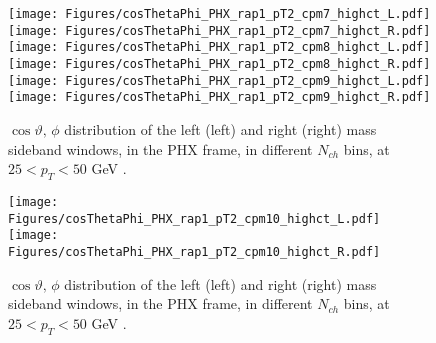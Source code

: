 \documentclass[12pt]{article}
\begin{document}
\begin{figure}[htbp]
\centering
\texttt{[image: Figures/cosThetaPhi\_PHX\_rap1\_pT2\_cpm7\_highct\_L.pdf]}
\texttt{[image: Figures/cosThetaPhi\_PHX\_rap1\_pT2\_cpm7\_highct\_R.pdf]}
\texttt{[image: Figures/cosThetaPhi\_PHX\_rap1\_pT2\_cpm8\_highct\_L.pdf]}
\texttt{[image: Figures/cosThetaPhi\_PHX\_rap1\_pT2\_cpm8\_highct\_R.pdf]}
\texttt{[image: Figures/cosThetaPhi\_PHX\_rap1\_pT2\_cpm9\_highct\_L.pdf]}
\texttt{[image: Figures/cosThetaPhi\_PHX\_rap1\_pT2\_cpm9\_highct\_R.pdf]}
\caption{$\cos\vartheta,\,\phi$ distribution of the left (left) and
  right (right) mass sideband windows, in the PHX frame, in different
  $N_{ch}$ bins, at $25 < p_{T} < 50$ GeV .}
\end{figure}
\clearpage

\begin{figure}[htbp]
\centering
\texttt{[image: Figures/cosThetaPhi\_PHX\_rap1\_pT2\_cpm10\_highct\_L.pdf]}
\texttt{[image: Figures/cosThetaPhi\_PHX\_rap1\_pT2\_cpm10\_highct\_R.pdf]}
\caption{$\cos\vartheta,\,\phi$ distribution of the left (left) and
  right (right) mass sideband windows, in the PHX frame, in different
  $N_{ch}$ bins, at $25 < p_{T} < 50$ GeV .}
\end{figure}
\clearpage
\end{document}
